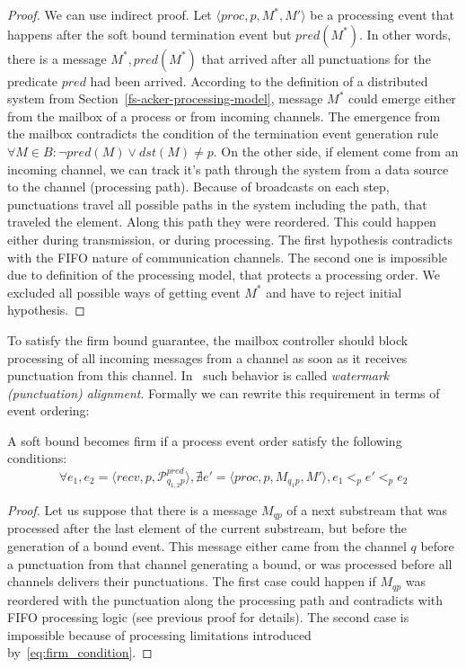 \begin{proof}
We can use indirect proof. Let $\langle proc, p, M^*, M' \rangle$ be a processing event that happens after the soft bound termination event but $pred(M^*)$. In other words, there is a message $M^*, pred(M^*)$ that arrived after all punctuations for the predicate $pred$ had been arrived. According to the definition of a distributed system from Section~\ref{fs-acker-processing-model}, message $M^*$ could emerge either from the mailbox of a process or from incoming channels. The emergence from the mailbox contradicts the condition of the termination event generation rule $\forall M\in B : \neg pred(M) \vee dst(M) \ne p$. On the other side, if element come from an incoming channel, we can track it's path through the system from a data source to the channel (processing path). Because of broadcasts on each step, punctuations travel all possible paths in the system including the path, that traveled the element. Along this path they were reordered. This could happen either during transmission, or during processing. The first hypothesis contradicts with the FIFO nature of communication channels. The second one is impossible due to definition of the processing model, that protects a processing order. We excluded all possible ways of getting event $M^*$ and have to reject initial hypothesis.
\end{proof}

To satisfy the firm bound guarantee, the mailbox controller should block processing of all incoming messages from a channel as soon as it receives punctuation from this channel. In~\cite{Carbone:2017:SMA:3137765.3137777} such behavior is called {\em watermark (punctuation) alignment}. Formally we can rewrite this requirement in terms of event ordering:

\begin{lemma}
A soft bound becomes firm if a process event order satisfy the following conditions:
\begin{equation}
  \forall e_1, e_2 = \langle recv, p, \mathcal{P}^{pred}_{q_{1,2}p} \rangle, \nexists e' = \langle proc, p, M_{q_1p}, M' \rangle, e_1 <_p e' <_p e_2
  \label{eq:firm_condition}
\end{equation}
\end{lemma}
\begin{proof}
Let us suppose that there is a message $M_{qp}$ of a next substream that was processed after the last element of the current substream, but before the generation of a bound event. This message either came from the channel $q$ before a punctuation from that channel generating a bound, or was processed before all channels delivers their punctuations. The first case could happen if $M_{qp}$ was reordered with the punctuation along the processing path and contradicts with FIFO processing logic (see previous proof for details). The second case is impossible because of processing limitations introduced by~\ref{eq:firm_condition}.
\end{proof}

